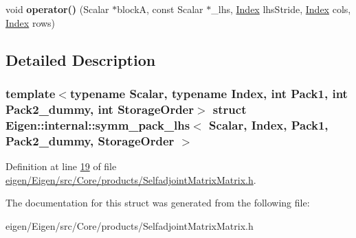 \begin{DoxyCompactItemize}
\item 
\mbox{\label{struct_eigen_1_1internal_1_1symm__pack__lhs_ae6a09da9a1adb8a1d9d0f3dc3c632d2e}} 
void {\bfseries operator()} (Scalar $\ast$blockA, const Scalar $\ast$\+\_\+lhs, \hyperlink{namespace_eigen_a62e77e0933482dafde8fe197d9a2cfde}{Index} lhs\+Stride, \hyperlink{namespace_eigen_a62e77e0933482dafde8fe197d9a2cfde}{Index} cols, \hyperlink{namespace_eigen_a62e77e0933482dafde8fe197d9a2cfde}{Index} rows)
\end{DoxyCompactItemize}


\subsection{Detailed Description}
\subsubsection*{template$<$typename Scalar, typename Index, int Pack1, int Pack2\+\_\+dummy, int Storage\+Order$>$\newline
struct Eigen\+::internal\+::symm\+\_\+pack\+\_\+lhs$<$ Scalar, Index, Pack1, Pack2\+\_\+dummy, Storage\+Order $>$}



Definition at line \hyperlink{eigen_2_eigen_2src_2_core_2products_2_selfadjoint_matrix_matrix_8h_source_l00019}{19} of file \hyperlink{eigen_2_eigen_2src_2_core_2products_2_selfadjoint_matrix_matrix_8h_source}{eigen/\+Eigen/src/\+Core/products/\+Selfadjoint\+Matrix\+Matrix.\+h}.



The documentation for this struct was generated from the following file\+:\begin{DoxyCompactItemize}
\item 
eigen/\+Eigen/src/\+Core/products/\+Selfadjoint\+Matrix\+Matrix.\+h\end{DoxyCompactItemize}
